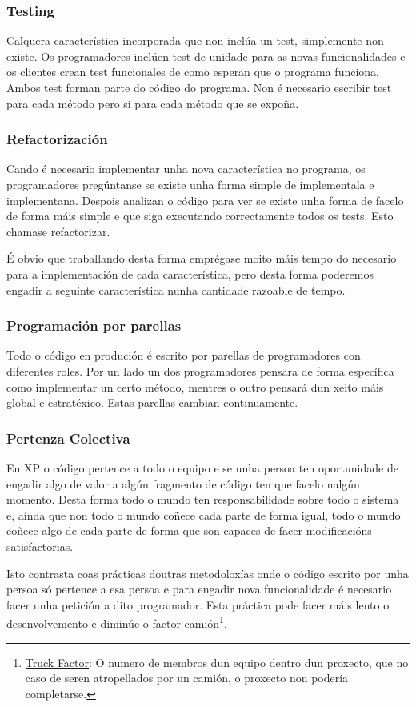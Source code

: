 \subsubsection{Testing}
Calquera característica incorporada que non inclúa un test, simplemente non existe. Os programadores inclúen test de unidade para as novas funcionalidades e os clientes crean test funcionales de como esperan que o programa funciona. Ambos test forman parte do código do programa. Non é necesario escribir test para cada método pero si para cada método que se expoña.

\subsubsection{Refactorización}
Cando é necesario implementar unha nova característica no programa, os programadores pregúntanse se existe unha forma simple de implementala e implementana. Despois analizan o código para ver se existe unha forma de facelo de forma máis simple e que siga executando correctamente todos os tests. Esto chamase refactorizar.

É obvio que traballando desta forma emprégase moito máis tempo do necesario para a implementación de cada característica, pero desta forma poderemos engadir a seguinte característica nunha cantidade razoable de tempo.

\subsubsection{Programación por parellas}
Todo o código en produción é escrito por parellas de programadores con diferentes roles. Por un lado un dos programadores pensara de forma específica como implementar un certo método, mentres o outro pensará dun xeito máis global e estratéxico. Estas parellas cambian continuamente.

\subsubsection{Pertenza Colectiva}
En XP o código pertence a todo o equipo e se unha persoa ten oportunidade de engadir algo de valor a algún fragmento de código ten que facelo nalgún momento. Desta forma todo o mundo ten responsabilidade sobre todo o sistema e, aínda que non todo o mundo coñece cada parte de forma igual, todo o mundo coñece algo de cada parte de forma que son capaces de facer modificacións satisfactorias.

Isto contrasta coas prácticas doutras metodoloxías onde o código escrito por unha persoa só pertence a esa persoa e para engadir nova funcionalidade é necesario facer unha petición a dito programador. Esta práctica pode facer máis lento o desenvolvemento e diminúe o factor camión\footnote{\href{http://en.wikipedia.org/wiki/Bus\_factor}{Truck Factor}: O numero de membros dun equipo dentro dun proxecto, que no caso de seren atropellados por un camión, o proxecto non podería completarse.}.

